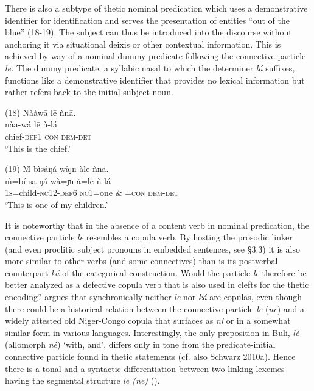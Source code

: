 \documentclass[output=paper]{langsci/langscibook}
\begin{document}
There is also a subtype of thetic nominal predication which uses a demonstrative identifier for identification and serves the presentation of entities “out of the blue” (18-19). The subject can thus be introduced into the discourse without anchoring it via situational deixis or other contextual information. This is achieved by way of a nominal dummy predicate following the connective particle \textit{l\={e}. }The dummy predicate, a syllabic nasal to which the determiner \textit{lá }suffixes\textit{, }functions like a demonstrative identifier that provides no lexical information but rather refers back to the initial subject noun.

\gll \textup{(18)}  Nààw\={a}    l\={e}  ǹn\={a}.\\
\gll \textup{  nàa-wá    l\={e}  ǹ-lá}\\
       chief-\textsc{def1}  \textsc{con}  \textsc{dem}{}-\textsc{det}\\
\glt ‘This is the chief.’ \citep[88]{Schwarz2007}
\z

\gll \textup{(19)}  \`{M}   bìsáŋá    wàɲ\={i}    àl\={e}    ǹn\={a}.\\
\gll \textup{  \`{m}=bí-sa-ŋá    wà=ɲ\={i}    à=l\={e}    ǹ-lá}\\
       1\textsc{s}=child-\textsc{nc}12-\textsc{def}6  \textsc{nc}1=one  \& =\textsc{con}  \textsc{dem-det}\\
\glt ‘This is one of my children.’ \citep[88]{Schwarz2007}
\z

It is noteworthy that in the absence of a content verb in nominal predication, the connective particle \textit{l\={e}} resembles a copula verb. By hosting the prosodic linker (and even proclitic subject pronouns in embedded sentences, see §3.3) it is also more similar to other verbs (and some connectives) than is its postverbal counterpart \textit{ká }of the categorical construction\textit{. }Would the particle \textit{l\={e} }therefore be better analyzed as a defective copula verb that is also used in clefts for the thetic encoding? \citet{Schwarz2009} argues that synchronically neither \textit{l\={e} }nor \textit{ká} are copulas, even though there could be a historical relation between the connective particle \textit{l\={e} }(\textit{n\={e}}) and a widely attested old Niger-Congo copula that surfaces as \textit{ni }or in a somewhat similar form in various languages. Interestingly, the only preposition in Buli, \textit{lè }(allomorph \textit{nè}) ‘with, and’, differs only in tone from the predicate-initial connective particle found in thetic statements (cf. also Schwarz 2010a). Hence there is a tonal and a syntactic differentiation between two linking lexemes having the segmental structure \textit{le (ne) }().
\end{document}
